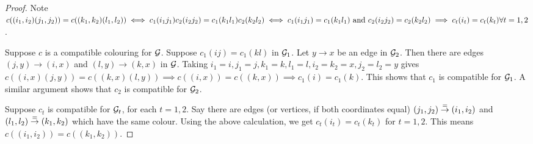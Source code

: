 \begin{proof}
Note $c((i_1,i_2)(j_1,j_2)) = c((k_1,k_2)(l_1,l_2)) \iff c_1(i_1j_1)c_2(i_2j_2) = c_1(k_1l_1)c_2(k_2l_2) \\\iff c_1(i_1j_1) = c_1(k_1l_1) \text{ and } c_2(i_2j_2) = c_2(k_2l_2)\implies c_t(i_t)=c_t(k_t)\forall t=1,2$.

Suppose $c$ is a compatible colouring for ${\mathcal{G}}$. Suppose $c_1(ij) = c_1(kl)$ in ${\mathcal{G}}_1$. Let $y\to x$ be an edge in ${\mathcal{G}}_2$. Then there are edges $(j,y)\to (i,x)$ and $(l,y)\to (k,x)$ in ${\mathcal{G}}$. Taking $i_1=i, j_1=j, k_1=k, l_1=l, i_2=k_2=x, j_2=l_2=y$ gives $c((i,x)(j,y)) = c((k,x)(l,y)) \implies c((i,x)) = c((k,x))\implies c_1(i) = c_1(k)$. This shows that $c_1$ is compatible for ${\mathcal{G}}_1$. A similar argument shows that $c_2$ is compatible for ${\mathcal{G}}_2$.

Suppose $c_t$ is compatible for ${\mathcal{G}}_t$, for each $t=1,2$. Say there are edges (or vertices, if both coordinates equal) $(j_1,j_2)\stackrel{=}{\to} (i_1,i_2)$ and $(l_1,l_2)\stackrel{=}{\to}(k_1,k_2)$ which have the same colour. Using the above calculation, we get $c_t(i_t) = c_t(k_t)$ for $t=1,2$. This means $c((i_1,i_2)) = c((k_1,k_2))$.
\hfill\end{proof}

